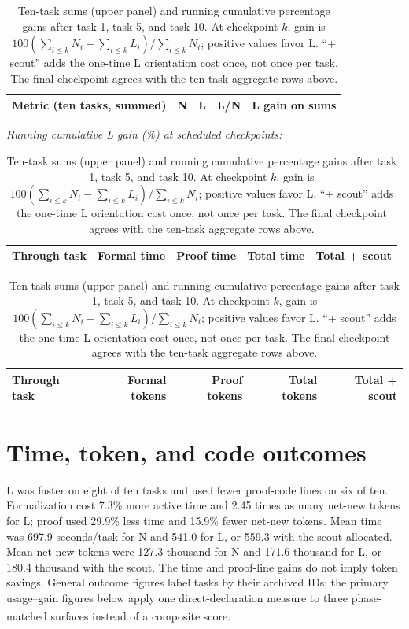 \documentclass[10pt,a4paper]{article}
\newcommand{\src}[1]{\textsuperscript{\cite{#1}}}
\begin{document}
\begin{table}[H]\centering\small
\begin{tabular}{@{}lrrrr@{}}\toprule
Metric (ten tasks, summed) & N & L & L/N & L gain on sums\\\midrule

\end{tabular}
\medskip

\textit{Running cumulative L gain (\%) at scheduled checkpoints:}
\begin{tabular}{@{}lrrrr@{}}\toprule
Through task & Formal time & Proof time & Total time & Total + scout\\\midrule

\end{tabular}

\medskip

\begin{tabular}{@{}lrrrr@{}}\toprule
Through task & Formal tokens & Proof tokens & Total tokens & Total + scout\\\midrule

\end{tabular}
\caption{Ten-task sums (upper panel) and running cumulative percentage gains
after task 1, task 5, and task 10. At checkpoint $k$, gain is
$100(\sum_{i\leq k}N_i-\sum_{i\leq k}L_i)/\sum_{i\leq k}N_i$;
positive values favor L. ``+ scout'' adds the one-time L orientation cost
once, not once per task. The final checkpoint agrees with the ten-task
aggregate rows above.\cite{summary,taskledger,plotcode,phaseplotcode}}
\label{tab:aggregate}
\end{table}

\section{Time, token, and code outcomes}

L was faster on eight of ten tasks and used fewer proof-code lines on six of
ten. Formalization cost 7.3\% more active time and 2.45 times as many net-new
tokens for L; proof used 29.9\% less time and 15.9\% fewer net-new tokens.
Mean time was 697.9 seconds/task for N and 541.0 for L, or 559.3 with the
scout allocated. Mean net-new tokens were 127.3 thousand for N and 171.6
thousand for L, or 180.4 thousand with the scout. The time and proof-line
gains do not imply token savings. General outcome figures label tasks by
their archived IDs; the primary usage--gain figures below apply one
direct-declaration measure to three phase-matched surfaces instead of a
composite score.\src{summary,usagepoints,plotcode}
\end{document}
